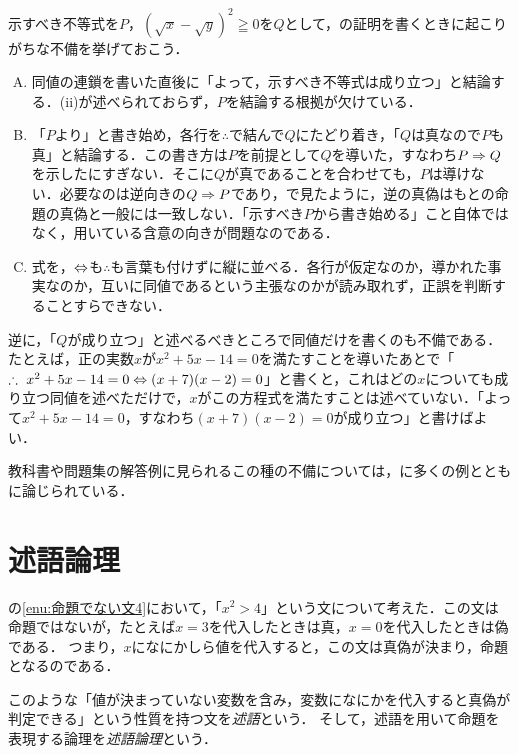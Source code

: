 \begin{remark}[同値を用いた証明でよく見かける不備]
  示すべき不等式を$P$，$(\sqrt{x} - \sqrt{y})^2 \geqq 0$を$Q$として，の証明を書くときに起こりがちな不備を挙げておこう．
  \begin{enumerate}[(A)]
    \item 同値の連鎖を書いた直後に「よって，示すべき不等式は成り立つ」と結論する．(ii)が述べられておらず，$P$を結論する根拠が欠けている．
    \item 「$P$より」と書き始め，各行を$\therefore$で結んで$Q$にたどり着き，「$Q$は真なので$P$も真」と結論する．この書き方は$P$を前提として$Q$を導いた，すなわち$P \mathrel{\Rightarrow} Q$を示したにすぎない．そこに$Q$が真であることを合わせても，$P$は導けない．必要なのは逆向きの$Q \mathrel{\Rightarrow} P$であり，で見たように，逆の真偽はもとの命題の真偽と一般には一致しない．「示すべき$P$から書き始める」こと自体ではなく，用いている含意の向きが問題なのである．
    \item 式を，$\mathrel{\Leftrightarrow}$も$\therefore$も言葉も付けずに縦に並べる．各行が仮定なのか，導かれた事実なのか，互いに同値であるという主張なのかが読み取れず，正誤を判断することすらできない．
  \end{enumerate}
  逆に，「$Q$が成り立つ」と述べるべきところで同値だけを書くのも不備である．たとえば，正の実数$x$が$x^2 + 5x - 14 = 0$を満たすことを導いたあとで「$\therefore \ x^2 + 5x - 14 = 0 \mathrel{\Leftrightarrow} (x + 7)(x - 2) = 0$」と書くと，これはどの$x$についても成り立つ同値を述べただけで，$x$がこの方程式を満たすことは述べていない．「よって$x^2 + 5x - 14 = 0$，すなわち$(x + 7)(x - 2) = 0$が成り立つ」と書けばよい．

  教科書や問題集の解答例に見られるこの種の不備については，\cite{sakiyama2023}に多くの例とともに論じられている．
\end{remark}


\section{述語論理}

の\ref{enu:命題でない文4}において，「$x^2 >4$」という文について考えた．この文は命題ではないが，たとえば$x=3$を代入したときは真，$x=0$を代入したときは偽である．
つまり，$x$になにかしら値を代入すると，この文は真偽が決まり，命題となるのである．

このような「値が決まっていない変数を含み，変数になにかを代入すると真偽が判定できる」という性質を持つ文を\emph{述語}という．
そして，述語を用いて命題を表現する論理を\emph{述語論理}という．


